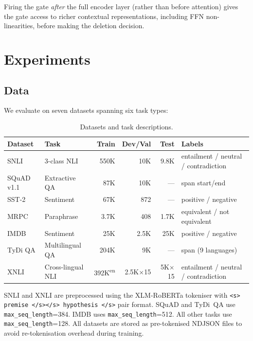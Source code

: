 \documentclass[11pt,a4paper]{article}
\begin{document}
Firing the gate \emph{after} the full encoder layer (rather than before attention) gives the gate access to richer contextual representations, including FFN non-linearities, before making the deletion decision.


\section{Experiments}
\label{sec:experiments}

\subsection{Data}
\label{sec:data}

We evaluate on seven datasets spanning six task types:

\begin{table}[h]
\centering
\small
\begin{tabular}{@{}llrrrL{4.5cm}@{}}
\toprule
\textbf{Dataset} & \textbf{Task} & \textbf{Train} & \textbf{Dev/Val} & \textbf{Test} & \textbf{Labels} \\
\midrule
SNLI     & 3-class NLI          & 550K & 10K  & 9.8K & entailment / neutral / contradiction \\
SQuAD v1.1 & Extractive QA      & 87K  & 10K  & ---  & span start/end \\
SST-2    & Sentiment            & 67K  & 872  & ---  & positive / negative \\
MRPC     & Paraphrase           & 3.7K & 408  & 1.7K & equivalent / not equivalent \\
IMDB     & Sentiment            & 25K  & 2.5K & 25K  & positive / negative \\
TyDi QA  & Multilingual QA      & 204K & 9K   & ---  & span (9 languages) \\
XNLI     & Cross-lingual NLI    & 392K\textsuperscript{en} & 2.5K$\times$15 & 5K$\times$15 & entailment / neutral / contradiction \\
\bottomrule
\end{tabular}
\caption{Datasets and task descriptions.}
\label{tab:datasets}
\end{table}

SNLI and XNLI are preprocessed using the XLM-RoBERTa tokeniser with \texttt{<s> premise </s></s> hypothesis </s>} pair format. SQuAD and TyDi~QA use \texttt{max\_seq\_length}=384. IMDB uses \texttt{max\_seq\_length}=512. All other tasks use \texttt{max\_seq\_length}=128. All datasets are stored as pre-tokenised NDJSON files to avoid re-tokenisation overhead during training.
\end{document}
